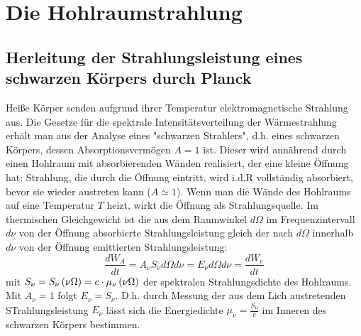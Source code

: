 \section{Die Hohlraumstrahlung} %
\label{sec:Die_Hohlraumstrahlung}
\subsection{Herleitung der Strahlungsleistung eines schwarzen Körpers durch
Planck} %
\label{sub:Herleitung_der_Strahlungsleistung_eines_schwarzen_Körpers_durch_Plan}
Heiße Körper senden aufgrund ihrer Temperatur elektromagnetische Strahlung aus.
Die Gesetze für die spektrale Intensitätsverteilung der Wärmestrahlung erhält
man aus der Analyse eines "schwarzen Strahlers", d.h. eines schwarzen Körpers,
dessen Absorptionsvermögen $A=1$ ist. Dieser wird annährend durch einen
Hohlraum mit absorbierenden Wänden realisiert, der eine kleine Öffnung hat:
Strahlung, die durch die Öffnung eintritt, wird i.d.R vollständig absorbiert,
bevor sie wieder austreten kann ($A\simeq1$).
Wenn man die Wände des Hohlraums auf eine Temperatur $T$ heizt, wirkt die
Öffnung als Strahlungsquelle. Im thermischen Gleichgewicht ist die aus dem
Raumwinkel $d\Omega$ im Frequenzintervall $d\nu$ von der Öffnung absorbierte
Strahlungsleistung gleich der nach $d\Omega$ innerhalb $d\nu$ von der Öffnung
emittierten Strahlungsleistung:
\begin{equation*}
    \frac{d W_A}{d t}= A_{\nu} S_{\nu} d\Omega d\nu 
    =
    E_{\nu} d\Omega d\nu = \frac{d W_e}{d t}
\end{equation*}
mit $S_{\nu} = S_{\nu} \left( \nu \Omega \right) = c \cdot \mu_{\nu} \left( \nu \Omega \right) $
der spektralen Strahlungsdichte des Hohlraums. Mit $A_{\nu} =1 $ folgt $E_{\nu}
= S_{\nu}$. D.h. durch Messung der aus dem Lich austretenden STrahlungsleistung
$E_{\nu}$ lässt sich die Energiedichte $\mu_{\nu} = \frac{S_{\mu}}{c}$ im
Inneren des schwarzen Körpers bestimmen.


